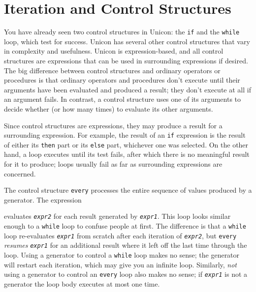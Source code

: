 \section{Iteration and Control Structures}

You have already seen two control structures in Unicon: the
\texttt{if} and the \texttt{while} loop, which test for
success.  Unicon has several other control structures
that vary in complexity and usefulness. Unicon is expression-based,
and all control structures are expressions that can be used in
surrounding expressions if desired. The big difference between control
structures and ordinary operators or procedures is that ordinary
operators and procedures don't execute until their arguments have been
evaluated and produced a result; they don't execute at all if an
argument fails. In contrast, a control structure uses one of its
arguments to decide whether (or how many times) to evaluate its other
arguments.

Since control structures are expressions, they may produce a result
for a surrounding expression. For example, the result of an
\texttt{if} expression is the result of either its \texttt{then} part
or its \texttt{else} part, whichever one was selected. On the other
hand, a loop executes until its test fails, after which there is no
meaningful result for it to produce; loops usually fail as far as
surrounding expressions are concerned.

The control structure \texttt{every}
processes the entire sequence of values produced by a generator. The expression


\noindent
evaluates \texttt{\textit{expr2}} for each result generated by
\texttt{\textit{expr1}}. This loop looks similar enough to a
\texttt{while} loop to confuse people at first. The difference is that
a \texttt{while} loop re-evaluates \texttt{\textit{expr1}} from scratch
after each iteration of \texttt{\textit{expr2}}, but \texttt{every}
\textit{resumes} \texttt{\textit{expr1}} for an additional result where
it left off the last time through the loop. Using a generator to
control a \texttt{while} loop makes no sense; the generator will
restart each iteration, which may give you an infinite loop. Similarly,
\textit{not} using a generator to control an \texttt{every} loop also
makes no sense; if \texttt{\textit{expr1}} is not a generator the loop
body executes at most one time.

